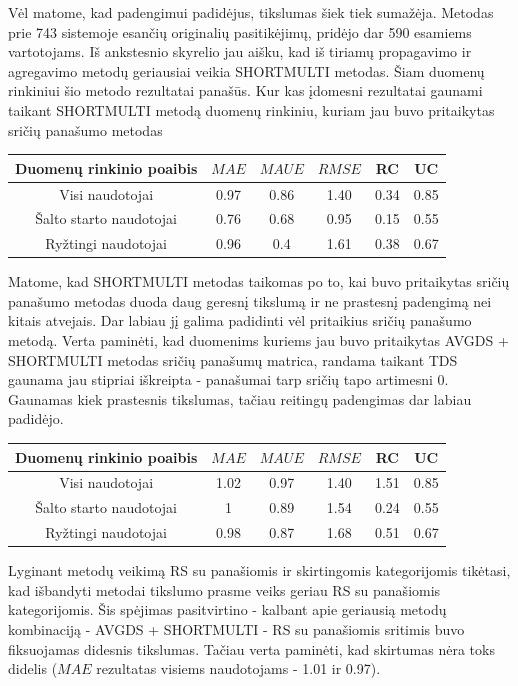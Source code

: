 \documentclass{VUMIFInfMagistrinis}
\begin{document}
Vėl matome, kad padengimui padidėjus, tikslumas šiek tiek sumažėja. Metodas prie 743 sistemoje esančių originalių pasitikėjimų, pridėjo dar 590 esamiems vartotojams.
\newline
\indent
Iš ankstesnio skyrelio jau aišku, kad iš tiriamų propagavimo ir agregavimo metodų geriausiai veikia SHORTMULTI metodas. Šiam duomenų rinkiniui šio metodo rezultatai panašūs. Kur kas įdomesni rezultatai gaunami taikant SHORTMULTI metodą duomenų rinkiniu, kuriam jau buvo pritaikytas sričių panašumo metodas
\begin{center}
	\begin{tabular}{||c c c c c c||} 
		Duomenų rinkinio poaibis & $MAE$ & $MAUE$ & $RMSE$ & RC & UC \\
		\hline
		Visi naudotojai & 0.97 & 0.86 & 1.40 & 0.34 & 0.85 \\
		\hline
		Šalto starto naudotojai & 0.76 & 0.68 & 0.95 & 0.15 & 0.55 \\
		\hline
		Ryžtingi naudotojai & 0.96 & 0.4 & 1.61 & 0.38 & 0.67 \\
	\end{tabular}
\end{center}
Matome, kad SHORTMULTI metodas taikomas po to, kai buvo pritaikytas sričių panašumo metodas duoda daug geresnį tikslumą ir ne prastesnį padengimą nei kitais atvejais. Dar labiau jį galima padidinti vėl pritaikius sričių panašumo metodą. Verta paminėti, kad duomenims kuriems jau buvo pritaikytas AVGDS + SHORTMULTI metodas sričių panašumų matrica, randama taikant TDS gaunama jau stipriai iškreipta - panašumai tarp sričių tapo artimesni 0. Gaunamas kiek prastesnis tikslumas, tačiau reitingų padengimas dar labiau padidėjo.
\begin{center}
	\begin{tabular}{||c c c c c c||} 
		Duomenų rinkinio poaibis & $MAE$ & $MAUE$ & $RMSE$ & RC & UC \\
		\hline
		Visi naudotojai & 1.02 & 0.97 & 1.40 & 1.51 & 0.85 \\
		\hline
		Šalto starto naudotojai & 1 & 0.89 & 1.54 & 0.24 & 0.55 \\
		\hline
		Ryžtingi naudotojai & 0.98 & 0.87 & 1.68 & 0.51 & 0.67 \\
	\end{tabular}
\end{center}
\indent
Lyginant metodų veikimą RS su panašiomis ir skirtingomis kategorijomis tikėtasi, kad išbandyti metodai tikslumo prasme veiks geriau RS su panašiomis kategorijomis. Šis spėjimas pasitvirtino - kalbant apie geriausią metodų kombinaciją - AVGDS + SHORTMULTI - RS su panašiomis sritimis buvo fiksuojamas didesnis tikslumas. Tačiau verta paminėti, kad skirtumas nėra toks didelis ($MAE$ rezultatas visiems naudotojams - 1.01 ir 0.97).
\end{document}
